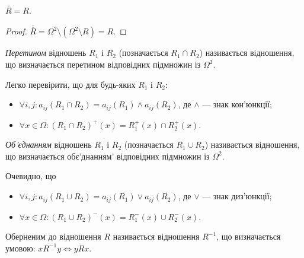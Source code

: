\begin{proposition}
	$\overline{\overline{R}} = R$.
\end{proposition}

\begin{proof}
	$\overline{\overline{R}} = \Omega^2 \setminus (\Omega^2 \setminus R) = R$.
\end{proof}

\begin{definition}
	\textit{Перетином} відношень $R_1$ і $R_2$ (позначається $R_1 \cap R_2$) називається відношення, що визначається перетином відповідних підмножин із $\Omega^2$.
\end{definition}

\begin{properties}
	Легко перевірити, що для будь-яких $R_1$ і $R_2$: 
	\begin{itemize}
		\item $\forall i, j: a_{ij} (R_1 \cap R_2) = a_{ij}(R_1) \land a_{ij}(R_2)$, де $\land$ --- знак кон'юнкції;
		\item $\forall x \in \Omega: (R_1 \cap R_2)^+(x) = R_1^+(x) \cap R_2^+(x)$.
	\end{itemize}
\end{properties}

\begin{definition}
	\textit{Об'єднанням} відношень $R_1$ і $R_2$ (позначається $R_1 \cup R_2$) називається відношення, що визначається обє'днанням' відповідних підмножин із $\Omega^2$.
\end{definition}

\begin{properties}
	Очевидно, що
	\begin{itemize}
		\item $\forall i, j: a_{ij}(R_1 \cup R_2) = a_{ij}(R_1) \lor a_{ij} (R_2)$, де $\lor$ --- знак диз'юнкції;
		\item $\forall x \in \Omega: (R_1 \cup R_2)^-(x) = R_1^-(x) \cup R_2^-(x)$.
	\end{itemize}
\end{properties}

\begin{definition}
	Оберненим до відношення $R$ називається відношення $R^{-1}$, що визначається умовою: $x R^{-1} y \iff y R x$.
\end{definition}

